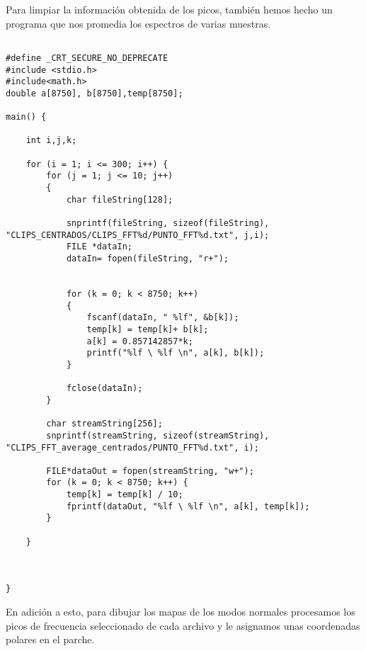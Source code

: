 \documentclass[journal, a4paper,onecolumn]{IEEEtran}
\begin{document}
Para limpiar la información obtenida de los picos, también hemos hecho un programa que nos promedia los espectros de varias muestras.
\newline
\begin{lstlisting}

#define _CRT_SECURE_NO_DEPRECATE
#include <stdio.h>
#include<math.h>
double a[8750], b[8750],temp[8750];

main() {

	int i,j,k;

	for (i = 1; i <= 300; i++) {
		for (j = 1; j <= 10; j++)
		{			
			char fileString[128];
			
			snprintf(fileString, sizeof(fileString), "CLIPS_CENTRADOS/CLIPS_FFT%d/PUNTO_FFT%d.txt", j,i);
			FILE *dataIn;
			dataIn= fopen(fileString, "r+");
			

			for (k = 0; k < 8750; k++)
			{
				fscanf(dataIn, " %lf", &b[k]);
				temp[k] = temp[k]+ b[k];
				a[k] = 0.857142857*k;
				printf("%lf \ %lf \n", a[k], b[k]);
			}
			
			fclose(dataIn);
		}

		char streamString[256];
		snprintf(streamString, sizeof(streamString), "CLIPS_FFT_average_centrados/PUNTO_FFT%d.txt", i);

		FILE*dataOut = fopen(streamString, "w+");
		for (k = 0; k < 8750; k++) {
			temp[k] = temp[k] / 10;
			fprintf(dataOut, "%lf \ %lf \n", a[k], temp[k]);
		}
	
	}
	
	
	
}

\end{lstlisting}

En adición a esto, para dibujar los mapas de los modos normales procesamos los picos de frecuencia seleccionado de cada archivo y le asignamos unas coordenadas polares en el parche. 
\end{document}

